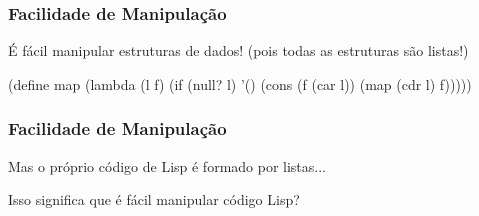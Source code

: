 
\begin{frame}[fragile]
  \frametitle{Facilidade de Manipulação}
  É fácil manipular estruturas de dados! (pois todas as estruturas são listas!)
  \vspace{0.5cm}
  \pause
  \begin{code}
  (define map
    (lambda (l f)
      (if (null? l)
          '()
          (cons (f (car l))
                (map (cdr l) f)))))
  \end{code}
\end{frame}

\begin{frame}[fragile]
  \frametitle{Facilidade de Manipulação}
  Mas o próprio código de Lisp é formado por listas...
  \vspace{1cm} \pause

  Isso significa que é fácil manipular código Lisp?
\end{frame}